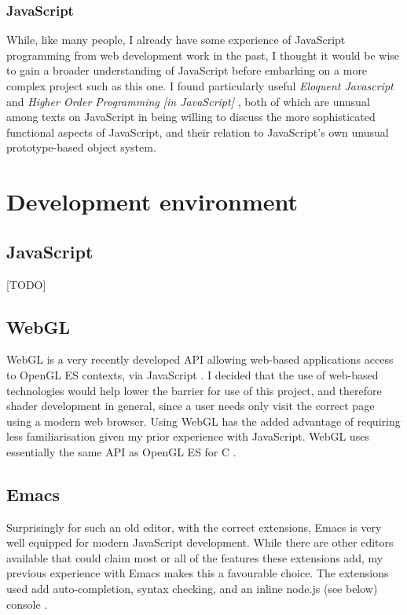 \documentclass[12pt,twoside,notitlepage]{report}
\begin{document}
\subsubsection{JavaScript}
While, like many people, I already have some experience of JavaScript programming from web development work in the past, I thought it would be wise to gain a broader understanding of JavaScript before embarking on a more complex project such as this one. I found particularly useful {\it Eloquent Javascript }\cite{eloquent} and {\it Higher Order Programming [in JavaScript] }\cite{higher-order}, both of which are unusual among texts on JavaScript in being willing to discuss the more sophisticated functional aspects of JavaScript, and their relation to JavaScript's own unusual prototype-based object system.


\section{Development environment}
\subsection*{JavaScript}
[TODO]
\subsection*{WebGL}
WebGL is a very recently developed API allowing web-based applications access to OpenGL ES contexts, via JavaScript \cite{webgl-spec}. I decided that the use of web-based technologies would help lower the barrier for use of this project, and therefore shader development in general, since a user needs only visit the correct page using a modern web browser. Using WebGL has the added advantage of requiring less familiarisation given my prior experience with JavaScript. WebGL uses essentially the same API as OpenGL ES for C \cite{webgl-spec}.


\subsection*{Emacs}
Surprisingly for such an old editor, with the correct extensions, Emacs is very well equipped for modern JavaScript development. While there are other editors available that could claim most or all of the features these extensions add, my previous experience with Emacs makes this a favourable choice. The extensions used add auto-completion, syntax checking, and an inline node.js (see below) console \cite{emacs-js}.
\end{document}
